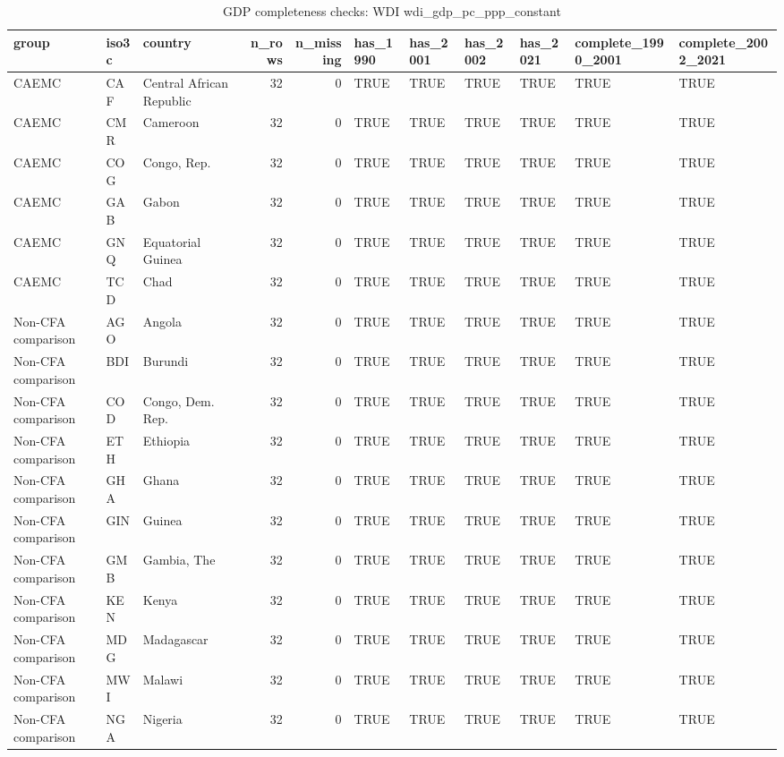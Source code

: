\begin{table}

\caption{GDP completeness checks: WDI wdi_gdp_pc_ppp_constant}
\centering
\begin{tabular}[t]{lllrrllllll}
\toprule
group & iso3c & country & n\_rows & n\_missing & has\_1990 & has\_2001 & has\_2002 & has\_2021 & complete\_1990\_2001 & complete\_2002\_2021\\
\midrule
CAEMC & CAF & Central African Republic & 32 & 0 & TRUE & TRUE & TRUE & TRUE & TRUE & TRUE\\
CAEMC & CMR & Cameroon & 32 & 0 & TRUE & TRUE & TRUE & TRUE & TRUE & TRUE\\
CAEMC & COG & Congo, Rep. & 32 & 0 & TRUE & TRUE & TRUE & TRUE & TRUE & TRUE\\
CAEMC & GAB & Gabon & 32 & 0 & TRUE & TRUE & TRUE & TRUE & TRUE & TRUE\\
CAEMC & GNQ & Equatorial Guinea & 32 & 0 & TRUE & TRUE & TRUE & TRUE & TRUE & TRUE\\
\addlinespace
CAEMC & TCD & Chad & 32 & 0 & TRUE & TRUE & TRUE & TRUE & TRUE & TRUE\\
Non-CFA comparison & AGO & Angola & 32 & 0 & TRUE & TRUE & TRUE & TRUE & TRUE & TRUE\\
Non-CFA comparison & BDI & Burundi & 32 & 0 & TRUE & TRUE & TRUE & TRUE & TRUE & TRUE\\
Non-CFA comparison & COD & Congo, Dem. Rep. & 32 & 0 & TRUE & TRUE & TRUE & TRUE & TRUE & TRUE\\
Non-CFA comparison & ETH & Ethiopia & 32 & 0 & TRUE & TRUE & TRUE & TRUE & TRUE & TRUE\\
\addlinespace
Non-CFA comparison & GHA & Ghana & 32 & 0 & TRUE & TRUE & TRUE & TRUE & TRUE & TRUE\\
Non-CFA comparison & GIN & Guinea & 32 & 0 & TRUE & TRUE & TRUE & TRUE & TRUE & TRUE\\
Non-CFA comparison & GMB & Gambia, The & 32 & 0 & TRUE & TRUE & TRUE & TRUE & TRUE & TRUE\\
Non-CFA comparison & KEN & Kenya & 32 & 0 & TRUE & TRUE & TRUE & TRUE & TRUE & TRUE\\
Non-CFA comparison & MDG & Madagascar & 32 & 0 & TRUE & TRUE & TRUE & TRUE & TRUE & TRUE\\
\addlinespace
Non-CFA comparison & MWI & Malawi & 32 & 0 & TRUE & TRUE & TRUE & TRUE & TRUE & TRUE\\
Non-CFA comparison & NGA & Nigeria & 32 & 0 & TRUE & TRUE & TRUE & TRUE & TRUE & TRUE\\

\end{tabular}
\end{table}
